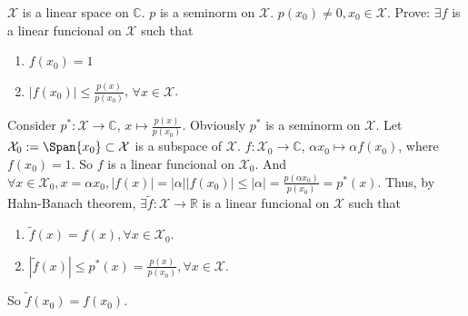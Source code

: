 \documentclass{ctexart}
\newif\ifpreface
\begin{document}
\large
\setlength{\baselineskip}{1.2em}
\ifpreface
    
\else
\maketitle
\fi
{}
\begin{problem}\label{pro:1}
\(\mathcal{X}\) is a linear space on \(\mathbb{C}\). $p$ is a seminorm on \(\mathcal{X}\). \(p(x_0) \neq 0, x_0 \in \mathcal{X}\).
Prove: \(\exists f\) is a linear funcional on \(\mathcal{X}\) such that
\begin{enumerate}
  \item \(f(x_0)=1\)
  \item \(|f(x_0)| \leq \frac{p(x)}{p(x_0)}\), \(\forall x \in \mathcal{X}\).
\end{enumerate}
\end{problem}
\begin{solution}
  Consider \(p^*: \mathcal{X} \to \mathbb{C}\), \(x \mapsto \frac{p(x)}{p(x_0)}\). Obviously \(p^*\) 
  is a seminorm on \(\mathcal{X}\). Let \(\mathcal{X}_0:=\Span\{x_0\} \subset \mathcal{X}\)
  is a subspace of \(\mathcal{X}\). \(f: \mathcal{X}_0 \to \mathbb{C}\), \(\alpha x_0 \mapsto \alpha f(x_0)\),
  where \(f(x_0)=1\). So \(f\) is a linear funcional on \(\mathcal{X}_0\). And \( \forall x \in \mathcal{X}_0, x= \alpha x_0, |f(x)|=|\alpha||f(x_0)| \leq |\alpha| = \frac{p(\alpha x_0)}{p(x_0)}=p^*(x)\).
  Thus, by Hahn-Banach theorem, \(\exists \tilde{f}: \mathcal{X} \to \mathbb{R}\) is a linear funcional on \(\mathcal{X}\) such that
  \begin{enumerate}
    \item \(\tilde{f}(x)=f(x), \forall x \in \mathcal{X}_0\).
    \item \(|\tilde{f}(x)| \leq p^*(x)=\frac{p(x)}{p(x_0)}, \forall x \in \mathcal{X}\).
  \end{enumerate}
  So \(\tilde{f}(x_0)=f(x_0)\). 
\end{solution}
\end{document}
